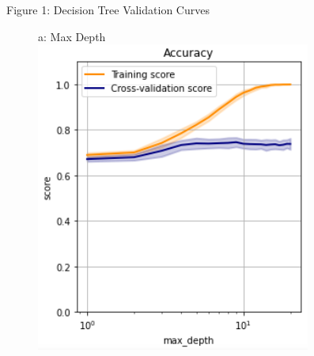 \documentclass{article}
\begin{document}
\begin{figure}
	\centering
	Figure 1: Decision Tree Validation Curves\\
	\begin{subfigure}{.24\textwidth}
		a: Max Depth
		\centering
		\includegraphics[width=\linewidth]{poland_decision_max_tree_depth_accuracy.png}
		

\end{subfigure}
\end{figure}
\end{document}
